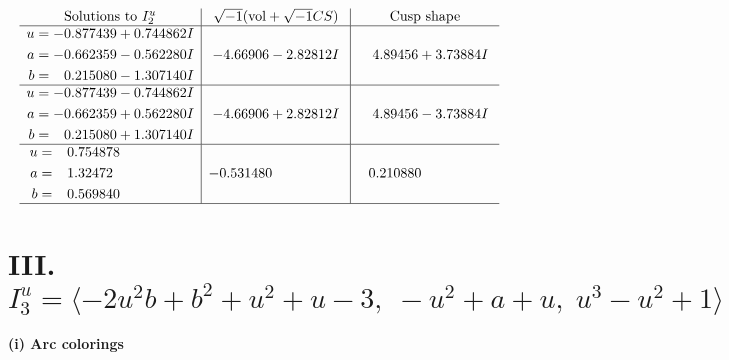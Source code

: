 \documentclass[1p]{elsarticle_modified}
\theoremstyle{definition}
\newcommand{\I}{\sqrt{-1}}
\begin{document}
$$\begin{array}{c|c|c}  
\text{Solutions to }I^u_{2}& \I (\text{vol} + \sqrt{-1}CS) & \text{Cusp shape}\\
 \hline 
\begin{aligned}
u &= -0.877439 + 0.744862 I \\
a &= -0.662359 - 0.562280 I \\
b &= \phantom{-}0.215080 - 1.307140 I\end{aligned}
 & -4.66906 - 2.82812 I & \phantom{-}4.89456 + 3.73884 I \\ \hline\begin{aligned}
u &= -0.877439 - 0.744862 I \\
a &= -0.662359 + 0.562280 I \\
b &= \phantom{-}0.215080 + 1.307140 I\end{aligned}
 & -4.66906 + 2.82812 I & \phantom{-}4.89456 - 3.73884 I \\ \hline\begin{aligned}
u &= \phantom{-}0.754878\phantom{ +0.000000I} \\
a &= \phantom{-}1.32472\phantom{ +0.000000I} \\
b &= \phantom{-}0.569840\phantom{ +0.000000I}\end{aligned}
 & -0.531480\phantom{ +0.000000I} & \phantom{-}0.210880\phantom{ +0.000000I}\\
 \hline 
 \end{array}$$\newpage\newpage\renewcommand{\arraystretch}{1}
\centering \section*{III. $I^u_{3}= \langle -2 u^2 b+b^2+u^2+u-3,\;- u^2+a+u,\;u^3- u^2+1 \rangle$}
\flushleft \textbf{(i) Arc colorings}\\
\end{document}
